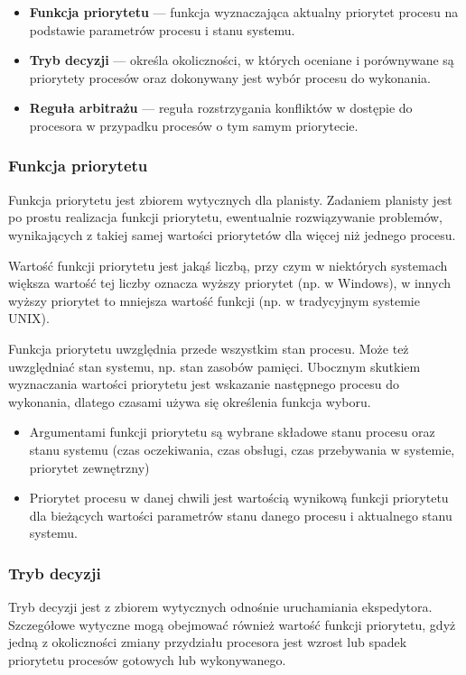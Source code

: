 \documentclass[12pt]{article}
\begin{document}
    \begin{itemize}
        \item \textbf{Funkcja priorytetu} — funkcja wyznaczająca aktualny priorytet procesu na podstawie parametrów procesu i stanu systemu.
        \item \textbf{Tryb decyzji} — określa okoliczności, w których oceniane i porównywane są priorytety procesów oraz dokonywany jest wybór procesu do wykonania.
        \item \textbf{Reguła arbitrażu} — reguła rozstrzygania konfliktów w dostępie do procesora w przypadku procesów o tym samym priorytecie.
    \end{itemize}
    
    \subsubsection{Funkcja priorytetu}
    Funkcja priorytetu jest zbiorem wytycznych dla planisty. Zadaniem planisty jest po prostu realizacja funkcji priorytetu, ewentualnie rozwiązywanie problemów, wynikających z takiej samej wartości priorytetów dla więcej niż jednego procesu.
    
    Wartość funkcji priorytetu jest jakąś liczbą, przy czym w niektórych systemach większa wartość tej liczby oznacza wyższy priorytet (np. w Windows), w innych wyższy priorytet to mniejsza wartość funkcji (np. w tradycyjnym systemie UNIX).
    
    Funkcja priorytetu uwzględnia przede wszystkim stan procesu. Może też uwzględniać stan systemu, np. stan zasobów pamięci. Ubocznym skutkiem wyznaczania wartości priorytetu jest wskazanie następnego procesu do wykonania, dlatego czasami używa się określenia funkcja wyboru.
    
    \begin{itemize}
        \item Argumentami funkcji priorytetu są wybrane składowe stanu procesu oraz stanu systemu (czas oczekiwania, czas obsługi, czas przebywania w systemie, priorytet zewnętrzny)
        \item Priorytet procesu w danej chwili jest wartością wynikową funkcji priorytetu dla bieżących wartości parametrów stanu danego procesu i aktualnego stanu systemu.
    \end{itemize}
    
    \subsubsection{Tryb decyzji}
    Tryb decyzji jest z zbiorem wytycznych odnośnie uruchamiania ekspedytora. Szczegółowe wytyczne mogą obejmować również wartość funkcji priorytetu, gdyż jedną z okoliczności zmiany przydziału procesora jest wzrost lub spadek priorytetu procesów gotowych lub wykonywanego.
    
\end{document}
